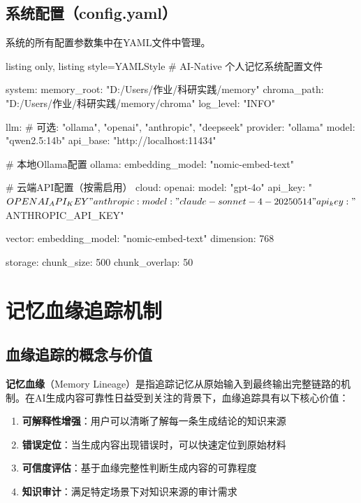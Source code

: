 \documentclass[12pt,a4paper,oneside]{article}
\begin{document}
\subsection{系统配置（config.yaml）}

系统的所有配置参数集中在YAML文件中管理。

\begin{tcblisting}{listing only, listing style=YAMLStyle}
# AI-Native 个人记忆系统配置文件

system:
  memory_root: "D:/Users/作业/科研实践/memory"
  chroma_path: "D:/Users/作业/科研实践/memory/chroma"
  log_level: "INFO"

llm:
  # 可选: "ollama", "openai", "anthropic", "deepseek"
  provider: "ollama"
  model: "qwen2.5:14b"
  api_base: "http://localhost:11434"

  # 本地Ollama配置
  ollama:
    embedding_model: "nomic-embed-text"

  # 云端API配置（按需启用）
  cloud:
    openai:
      model: "gpt-4o"
      api_key: "${OPENAI_API_KEY}"
    anthropic:
      model: "claude-sonnet-4-20250514"
      api_key: "${ANTHROPIC_API_KEY}"

vector:
  embedding_model: "nomic-embed-text"
  dimension: 768

storage:
  chunk_size: 500
  chunk_overlap: 50
\end{tcblisting}

\newpage

\section{记忆血缘追踪机制}

\subsection{血缘追踪的概念与价值}

\textbf{记忆血缘}（Memory Lineage）是指追踪记忆从原始输入到最终输出完整链路的机制。在AI生成内容可靠性日益受到关注的背景下，血缘追踪具有以下核心价值：

\begin{enumerate}[\arabic*)]
    \item \textbf{可解释性增强}：用户可以清晰了解每一条生成结论的知识来源
    \item \textbf{错误定位}：当生成内容出现错误时，可以快速定位到原始材料
    \item \textbf{可信度评估}：基于血缘完整性判断生成内容的可靠程度
    \item \textbf{知识审计}：满足特定场景下对知识来源的审计需求
\end{enumerate}
\end{document}
